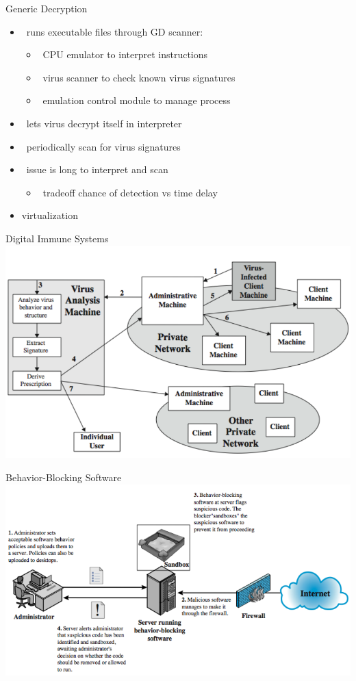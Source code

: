 \documentclass{beamer}
\begin{document}
\begin{frame}{Generic Decryption }
  \begin{itemize}
  \item  runs executable files through GD scanner: 
    \begin{itemize}
    \item  CPU emulator to interpret instructions 
    \item  virus scanner to check known virus signatures 
    \item  emulation control module to manage process 
    \end{itemize}
  \item  lets virus decrypt itself in interpreter 
  \item  periodically scan for virus signatures 
  \item  issue is long to interpret and scan 
    \begin{itemize}
    \item  tradeoff chance of detection vs time delay
    \end{itemize}
  \item virtualization
  \end{itemize}
\end{frame}

\begin{frame}{Digital Immune Systems}
\includegraphics[width=0.8\linewidth]{digitalImmuneSystem}
\end{frame}

\begin{frame}{Behavior-Blocking Software}
\includegraphics[width=0.8\linewidth]{behaviorBlocking}
\end{frame}
\end{document}

